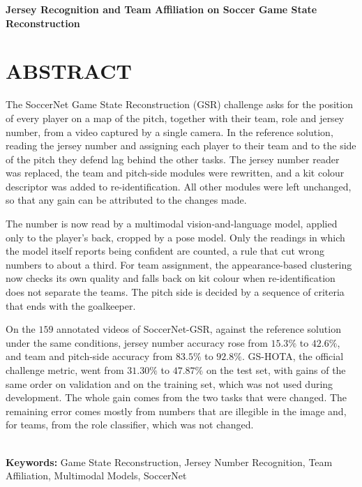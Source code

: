 \begingroup
\begin{flushleft}
\bfseries
{}
{\Large
Jersey Recognition and Team Affiliation on Soccer Game State Reconstruction}

\mdseries
\end{flushleft}
\normalsize
\let\clearpage\relax
\chapter{ABSTRACT}
\endgroup

\noindent The SoccerNet Game State Reconstruction (GSR) challenge asks for the position of every
player on a map of the pitch, together with their team, role and jersey number, from a video captured
by a single camera. In the reference solution, reading the jersey number and assigning each player to their team and
to the side of the pitch they defend lag behind the other tasks. The jersey number reader was replaced, the team and pitch-side modules
were rewritten, and a kit colour descriptor was added to re-identification. All other modules were left
unchanged, so that any gain can be attributed to the changes made.

The number is now read by a multimodal vision-and-language model, applied only to the player's back,
cropped by a pose model. Only the readings in which the model itself reports being
confident are counted, a rule that cut wrong numbers to about a third. For team assignment, the
appearance-based clustering now checks its own quality and falls back on kit colour when
re-identification does not separate the teams. The pitch side is decided by a sequence of criteria
that ends with the goalkeeper.

On the $159$ annotated videos of SoccerNet-GSR, against the reference solution under the same conditions, jersey number accuracy rose from $15.3\%$ to $42.6\%$, and team and pitch-side
accuracy from $83.5\%$ to $92.8\%$. GS-HOTA, the official challenge metric, went from
$31.30\%$ to $47.87\%$ on the test set, with gains of the same order on validation and on the
training set, which was not used during development. The whole gain comes from the two tasks that were
changed. The remaining error comes mostly from numbers that are illegible in the image and, for teams,
from the role classifier, which was not changed.

\hspace{3cm}\\
\indent
\textbf{Keywords: } Game State Reconstruction, Jersey Number Recognition, Team Affiliation,
Multimodal Models, SoccerNet
